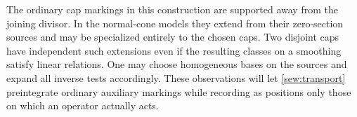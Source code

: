 The ordinary cap markings in this construction are supported away from
the joining divisor.  In the normal-cone models they extend from their
zero-section sources and may be specialized entirely to the chosen
caps.  Two disjoint caps have independent such extensions even if the
resulting classes on a smoothing satisfy linear relations.  One may
choose homogeneous bases on the sources and expand all inverse tests
accordingly.  These observations will let \cref{sew:transport} preintegrate
ordinary auxiliary markings while recording as positions only those
on which an operator actually acts.
